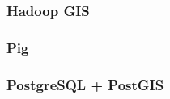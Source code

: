 \documentclass[hyperref={pdfpagelabels=true}]{beamer}
\begin{document}
\begin{frame}
\frametitle{Hadoop GIS}
\end{frame}

\begin{frame}
\frametitle{Pig}
\end{frame}

\begin{frame}
\frametitle{PostgreSQL + PostGIS}
\end{frame}
\end{document}
